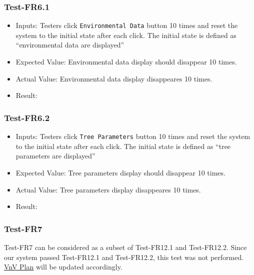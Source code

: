 \documentclass[12pt, titlepage]{article}
\begin{document}
\subsubsection{Test-FR6.1}
\begin{itemize}
    \item Inputs: Testers click \verb|Environmental Data| button 10 times and reset 
    the system to the initial state after each click. The initial state is defined
    as ``environmental data are displayed''
    \item Expected Value: Environmental data display should disappear 10 times.
    \item Actual Value: Environmental data display disappeares 10 times.
    \item Result: \pass
\end{itemize}

\subsubsection{Test-FR6.2}
\begin{itemize}
    \item Inputs: Testers click \verb|Tree Parameters| button 10 times and reset 
    the system to the initial state after each click. The initial state is defined
    as ``tree parameters are displayed''
    \item Expected Value: Tree parameters display should disappear 10 times.
    \item Actual Value: Tree parameters display disappeares 10 times.
    \item Result: \pass
\end{itemize}

\subsubsection{Test-FR7}
Test-FR7 can be considered as a subset of Test-FR12.1 and Test-FR12.2. Since our 
system passed Test-FR12.1 and Test-FR12.2, this test was not performed. \href{https://github.com/wuj187/DigitalTwinCAS/blob/main/docs/VnVPlan/VnVPlan.pdf}{VnV Plan} will be updated accordingly.

\end{document}
